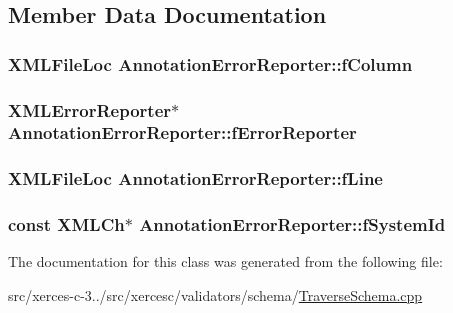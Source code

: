 \subsection{Member Data Documentation}
\hypertarget{classAnnotationErrorReporter_a3e5c976170b1062bd2c86caa7e5c531e}{
\subsubsection[{f\-Column}]{\setlength{\rightskip}{0pt plus 5cm}X\-M\-L\-File\-Loc Annotation\-Error\-Reporter\-::f\-Column\hspace{0.3cm}{\ttfamily [protected]}}}\label{classAnnotationErrorReporter_a3e5c976170b1062bd2c86caa7e5c531e}
\hypertarget{classAnnotationErrorReporter_a15d1d4e1b7ed000e1703c876021aed6e}{
\subsubsection[{f\-Error\-Reporter}]{\setlength{\rightskip}{0pt plus 5cm}X\-M\-L\-Error\-Reporter$\ast$ Annotation\-Error\-Reporter\-::f\-Error\-Reporter\hspace{0.3cm}{\ttfamily [protected]}}}\label{classAnnotationErrorReporter_a15d1d4e1b7ed000e1703c876021aed6e}
\hypertarget{classAnnotationErrorReporter_a8a861fd734bc340d819b1e8f4ea0a31c}{
\subsubsection[{f\-Line}]{\setlength{\rightskip}{0pt plus 5cm}X\-M\-L\-File\-Loc Annotation\-Error\-Reporter\-::f\-Line\hspace{0.3cm}{\ttfamily [protected]}}}\label{classAnnotationErrorReporter_a8a861fd734bc340d819b1e8f4ea0a31c}
\hypertarget{classAnnotationErrorReporter_a3525f2b182105757e85509f8ce78daac}{
\subsubsection[{f\-System\-Id}]{\setlength{\rightskip}{0pt plus 5cm}const X\-M\-L\-Ch$\ast$ Annotation\-Error\-Reporter\-::f\-System\-Id\hspace{0.3cm}{\ttfamily [protected]}}}\label{classAnnotationErrorReporter_a3525f2b182105757e85509f8ce78daac}


The documentation for this class was generated from the following file\-:\begin{DoxyCompactItemize}
\item 
src/xerces-\/c-\/3../src/xercesc/validators/schema/\hyperlink{TraverseSchema_8cpp}{Traverse\-Schema.\-cpp}\end{DoxyCompactItemize}

